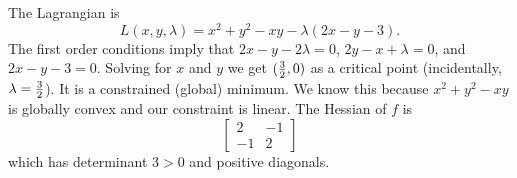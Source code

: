 \documentclass[11pt]{article}
\begin{document}
\begin{enumerate}
\begin{enumerate}
The Lagrangian is $$L(x, y, \lambda)=x^2+y^2-xy-\lambda(2x-y-3).$$  The first order conditions imply that $2x-y-2\lambda=0$, $2y-x+\lambda=0$, and $2x-y-3=0$.  Solving for $x$ and $y$ we get $({3\over 2},0)$ as a critical point (incidentally, $\lambda={3\over 2}$).  It is a constrained (global) minimum.  We know this because $x^2+y^2-xy$ is globally convex and our constraint is linear. The Hessian of $f$ is $$\begin{bmatrix}2& -1\\-1& 2\end{bmatrix}$$ which has determinant $3>0$ and positive diagonals. 
\end{enumerate}

\end{enumerate}
\end{document}
